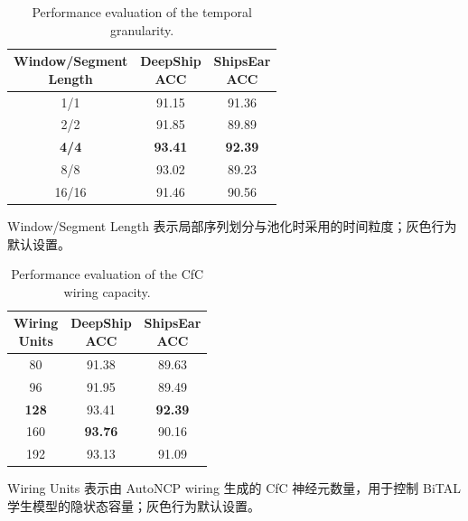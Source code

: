 \documentclass[a4paper, 12pt]{article}
\begin{document}
\begin{table}[htbp]
\centering
\caption{Performance evaluation of the temporal granularity.}
\label{tab:temporal_granularity_analysis}
\small
\setlength{\tabcolsep}{10pt}
\begin{tabular}{c|c|c}
\toprule
\makecell{Window/Segment\\Length} &
\makecell{DeepShip\\ACC} &
\makecell{ShipsEar\\ACC} \\
\midrule
1/1   & 91.15 & 91.36 \\
2/2   & 91.85 & 89.89 \\
\rowcolor{gray!15}
\textbf{4/4} & \textbf{93.41} & \textbf{92.39} \\
8/8   & 93.02 & 89.23 \\
16/16 & 91.46 & 90.56 \\
\bottomrule
\end{tabular}
\vspace{0.5ex}
\par\footnotesize Window/Segment Length 表示局部序列划分与池化时采用的时间粒度；灰色行为默认设置。
\end{table}

\begin{table}[htbp]
\centering
\caption{Performance evaluation of the CfC wiring capacity.}
\label{tab:cfc_capacity_analysis}
\small
\setlength{\tabcolsep}{10pt}
\begin{tabular}{c|c|c}
\toprule
\makecell{Wiring\\Units} &
\makecell{DeepShip\\ACC} &
\makecell{ShipsEar\\ACC} \\
\midrule
80  & 91.38 & 89.63 \\
96  & 91.95 & 89.49 \\
\rowcolor{gray!15}
\textbf{128} & 93.41 & \textbf{92.39} \\
160 & \textbf{93.76} & 90.16 \\
192 & 93.13 & 91.09 \\
\bottomrule
\end{tabular}
\vspace{0.5ex}
\par\footnotesize Wiring Units 表示由 AutoNCP wiring 生成的 CfC 神经元数量，用于控制 BiTAL 学生模型的隐状态容量；灰色行为默认设置。
\end{table}
\end{document}
